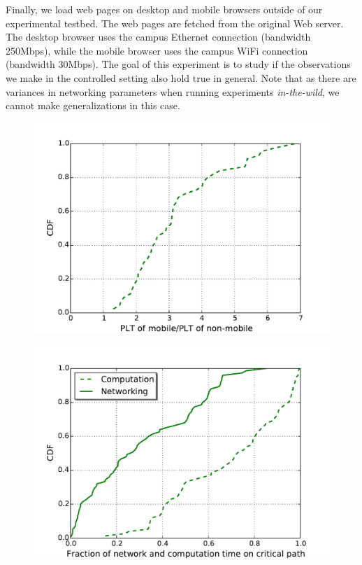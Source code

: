 \noindent Finally, we load web pages on desktop and mobile browsers outside of our experimental testbed.  The web pages are fetched from the original Web server. The desktop browser uses the campus Ethernet connection (bandwidth 250Mbps), while the mobile browser uses the campus WiFi connection (bandwidth 30Mbps). The goal of this experiment is to study if the observations we make in the controlled setting also hold true in general. Note that as there are variances in networking parameters when running experiments {\em in-the-wild}, we cannot make generalizations in this case.

\begin{figure}[!htb]
\begin{minipage}[b]{.48\textwidth}
  \includegraphics[width=\linewidth]{./figures/uncontrolled/mobile_desktop_plt_ratio_uncontrolled.pdf}
  \label{fig:plt_uncontrolled_mobile_desktop}
\end{minipage}%
\hspace{0.5cm}
\begin{minipage}[b]{.48\textwidth}
  \includegraphics[width=\linewidth]{./figures/uncontrolled/mobile_uncontrolled.pdf}
  \label{fig:network_comp_uncontrolled_mobile}
\end{minipage}
\end{figure}

